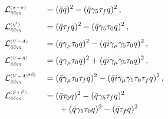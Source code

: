 \documentclass[aps,twocolumn,prd,superscriptaddress]{revtex4-2}
\begin{document}
\vspace{-4mm}
\begin{alignat}{2}\hspace{5ex}
	 & \mathcal{L}_{\scriptscriptstyle\bar q\bar qqq}^{\scriptscriptstyle(\sigma-\pi)}       &  & = (\bar q q)^2 - (\bar q \gamma_5 \tau_f q )^2
	\,,\notag                                                                                                                                                                             \\[1ex]
	 & \mathcal{L}_{\scriptscriptstyle\bar q\bar qqq}^{\scriptscriptstyle(\eta')}            &  & = (\bar q \tau_f q )^2 - (\bar q \gamma_5 \tau_0 q )^2
	\,,\notag                                                                                                                                                                             \\[1ex]
	 & \mathcal{L}_{\scriptscriptstyle\bar q\bar qqq}^{\scriptscriptstyle(V-A)}              &  & = (\bar{q}\gamma_\mu \tau_0 q)^2 - (\bar{q}i\gamma_\mu\gamma_5\tau_0q)^2
	\,,\notag                                                                                                                                                                             \\[1ex]
	 & \mathcal{L}_{\scriptscriptstyle\bar q\bar qqq}^{\scriptscriptstyle(V+A)}              &  & = (\bar{q}\gamma_\mu \tau_0 q)^2 + (\bar{q}i\gamma_\mu\gamma_5\tau_0q)^2
	\,,\notag                                                                                                                                                                             \\[1ex]
	 & \mathcal{L}_{\scriptscriptstyle\bar q\bar qqq}^{\scriptscriptstyle(V-A)^\text{adj}}   &  & = (\bar{q}\gamma_\mu \tau_0 \tau_f q)^2 - (\bar{q}i\gamma_\mu\gamma_5\tau_0 \tau_f q)^2
	\,,\notag                                                                                                                                                                             \\[1ex]
	 & \mathcal{L}_{\scriptscriptstyle\bar q\bar qqq}^{\scriptscriptstyle(S+P)_-}            &  & = (\bar{q} \tau_0 q)^2 - (\bar{q}\gamma_5 \tau_f q)^2
	\notag                                                                                                                                                                                \\&&&\hspace{4ex} + (\bar q \gamma_5 \tau_0 q )^2 - (\bar q \tau_f q )^2

\end{alignat}
\end{document}
